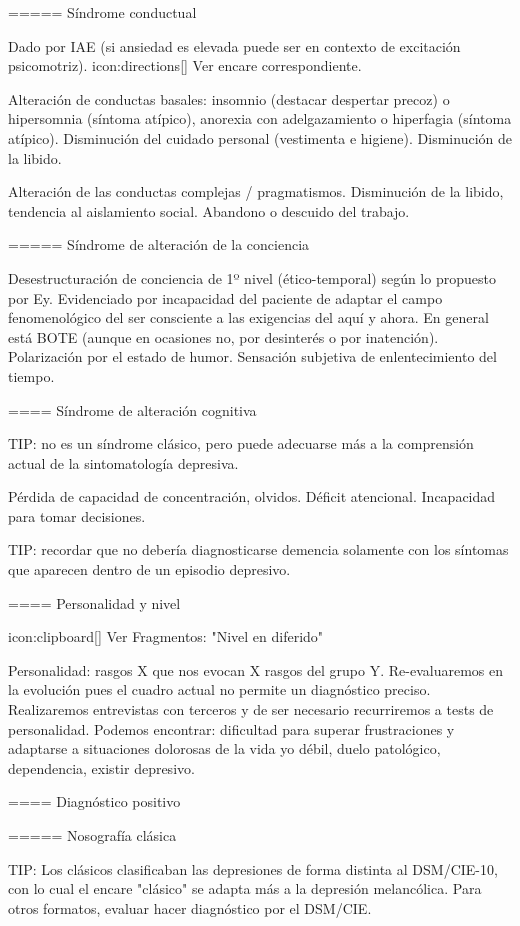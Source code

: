 ===== Síndrome conductual

Dado por IAE (si ansiedad es elevada puede ser en contexto de excitación psicomotriz). icon:directions[] Ver encare correspondiente.

Alteración de conductas basales: insomnio (destacar despertar precoz) o hipersomnia (síntoma atípico), anorexia con adelgazamiento o hiperfagia (síntoma atípico). Disminución del cuidado personal (vestimenta e higiene). Disminución de la libido.

Alteración de las conductas complejas / pragmatismos. Disminución de la libido, tendencia al aislamiento social. Abandono o descuido del trabajo.

===== Síndrome de alteración de la conciencia

Desestructuración de conciencia de 1º nivel (ético-temporal) según lo propuesto por Ey. Evidenciado por incapacidad del paciente de adaptar el campo fenomenológico del ser consciente a las exigencias del aquí y ahora.
En general está BOTE (aunque en ocasiones no, por desinterés o por inatención). Polarización por el estado de humor.
Sensación subjetiva de enlentecimiento del tiempo.

==== Síndrome de alteración cognitiva

TIP: no es un síndrome clásico, pero puede adecuarse más a la comprensión actual de la sintomatología depresiva.

Pérdida de capacidad de concentración, olvidos. Déficit atencional.
Incapacidad para tomar decisiones.

TIP: recordar que no debería diagnosticarse demencia solamente con los síntomas que aparecen dentro de un episodio depresivo.

==== Personalidad y nivel

icon:clipboard[] Ver Fragmentos: "Nivel en diferido"

Personalidad: rasgos X que nos evocan X rasgos del grupo Y. Re-evaluaremos en la evolución pues el cuadro actual no permite un diagnóstico preciso. Realizaremos entrevistas con terceros y de ser necesario recurriremos a tests de personalidad. Podemos encontrar: dificultad para superar frustraciones y adaptarse a situaciones dolorosas de la vida yo débil, duelo patológico, dependencia, existir depresivo.

==== Diagnóstico positivo

===== Nosografía clásica

TIP: Los clásicos clasificaban las depresiones de forma distinta al DSM/CIE-10, con lo cual el encare "clásico" se adapta más a la depresión melancólica. Para otros formatos, evaluar hacer diagnóstico por el DSM/CIE.

